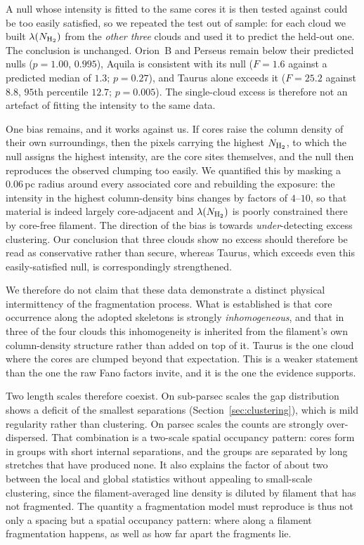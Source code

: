 \documentclass[usenatbib,twoside,twocolumn]{mnras}
\begin{document}
A null whose intensity is fitted to the same cores it is then tested against could be too easily satisfied, so we repeated the test out of sample: for each cloud we built $\lambda(N_{\rm H_2})$ from the \emph{other three} clouds and used it to predict the held-out one. The conclusion is unchanged. Orion~B and Perseus remain below their predicted nulls ($p=1.00$, $0.995$), Aquila is consistent with its null ($F=1.6$ against a predicted median of $1.3$; $p=0.27$), and Taurus alone exceeds it ($F=25.2$ against $8.8$, $95$th percentile $12.7$; $p=0.005$). The single-cloud excess is therefore not an artefact of fitting the intensity to the same data.

One bias remains, and it works against us. If cores raise the column density of their own surroundings, then the pixels carrying the highest $N_{\rm H_2}$, to which the null assigns the highest intensity, are the core sites themselves, and the null then reproduces the observed clumping too easily. We quantified this by masking a $0.06$\,pc radius around every associated core and rebuilding the exposure: the intensity in the highest column-density bins changes by factors of $4$--$10$, so that material is indeed largely core-adjacent and $\lambda(N_{\rm H_2})$ is poorly constrained there by core-free filament. The direction of the bias is towards \emph{under}-detecting excess clustering. Our conclusion that three clouds show no excess should therefore be read as conservative rather than secure, whereas Taurus, which exceeds even this easily-satisfied null, is correspondingly strengthened.

We therefore do not claim that these data demonstrate a distinct physical intermittency of the fragmentation process. What is established is that core occurrence along the adopted skeletons is strongly \emph{inhomogeneous}, and that in three of the four clouds this inhomogeneity is inherited from the filament's own column-density structure rather than added on top of it. Taurus is the one cloud where the cores are clumped beyond that expectation. This is a weaker statement than the one the raw Fano factors invite, and it is the one the evidence supports.

Two length scales therefore coexist. On sub-parsec scales the gap distribution shows a deficit of the smallest separations (Section~\ref{sec:clustering}), which is mild regularity rather than clustering. On parsec scales the counts are strongly over-dispersed. That combination is a two-scale spatial occupancy pattern: cores form in groups with short internal separations, and the groups are separated by long stretches that have produced none. It also explains the factor of about two between the local and global statistics without appealing to small-scale clustering, since the filament-averaged line density is diluted by filament that has not fragmented. The quantity a fragmentation model must reproduce is thus not only a spacing but a spatial occupancy pattern: where along a filament fragmentation happens, as well as how far apart the fragments lie.
\end{document}
